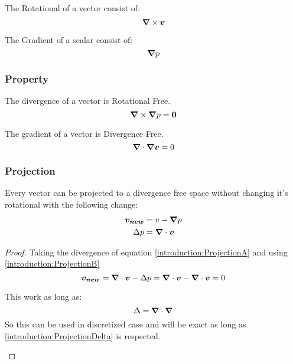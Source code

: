 \begin{definition}
 The Rotational of a vector consist of:
 \begin{equation}
  {\boldsymbol {\nabla}} \times {\boldsymbol {v}}
 \end{equation}
\end{definition}

\begin{definition}
 The Gradient of a scalar consist of:
 \begin{equation}
  {\boldsymbol {\nabla}} p
 \end{equation}
\end{definition}

\subsubsection{Property}

\begin{property}
 The divergence of a vector is Rotational Free.
 \begin{equation}
  {\boldsymbol {\nabla}}\times {\boldsymbol {\nabla}} p={\boldsymbol {0}}
 \end{equation}
\end{property}

\begin{property}
The gradient of a vector is Divergence Free.
 \begin{equation}
  {\boldsymbol {\nabla}}\cdot {\boldsymbol {\nabla}} {\boldsymbol {v}}=0
 \end{equation}
\end{property}
\subsubsection{Projection}

\label{introduction:projection}
\begin{property}
 Every vector can be projected to a divergence free space without changing it's rotational with the following change:
\begin{align}
 {\boldsymbol {v_{new}}}&=v-{\boldsymbol {\nabla}}p \label{introduction:ProjectionA}\\
 \Delta p&={\boldsymbol {\nabla}} \cdot {\boldsymbol {v}} \label{introduction:ProjectionB}
\end{align}
\end{property}
\begin{proof}
  Taking the divergence of equation \ref{introduction:ProjectionA} and using \ref{introduction:ProjectionB}
  \begin{equation}
   {\boldsymbol {v_{new}}}={\boldsymbol {\nabla}}\cdot{\boldsymbol {v}}-\Delta p={\boldsymbol {\nabla}}\cdot{\boldsymbol {v}}-{\boldsymbol {\nabla}}\cdot{\boldsymbol {v}}=0
  \end{equation}
  \begin{rem}
 This work as long as:
 \begin{equation}
  \Delta={\boldsymbol {\nabla}}\cdot {\boldsymbol {\nabla}}\label{introduction:ProjectionDelta}
 \end{equation}
 So this can be used in discretized case and will be exact as long as \ref{introduction:ProjectionDelta} is respected.
 \end{rem}
\end{proof}

